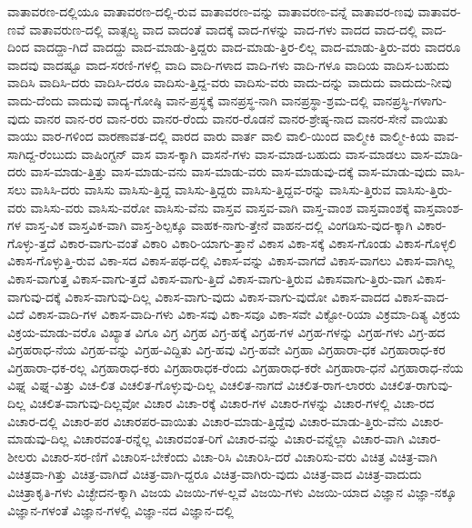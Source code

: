 {ವಾತಾವರಣ-ದಲ್ಲಿಯೂ
ವಾತಾವರಣ-ದಲ್ಲಿ-ರುವ
ವಾತಾವರಣ-ವನ್ನು
ವಾತಾವರಣ-ವನ್ನೆ
ವಾತಾವರ-ಣವು
ವಾತಾವರ-ಣವೆ
ವಾತಾವರುಣ-ದಲ್ಲಿ
ವಾತ್ಸಲ್ಯ
ವಾದ
ವಾದಂತೆ
ವಾದಕ್ಕೆ
ವಾದ-ಗಳನ್ನು
ವಾದ-ಗಳು
ವಾದದ
ವಾದ-ದಲ್ಲಿ
ವಾದ-ದಿಂದ
ವಾದದ್ದಾ-ಗಿದೆ
ವಾದದ್ದು
ವಾದ-ಮಾಡು-ತ್ತಿದ್ದರು
ವಾದ-ಮಾಡು-ತ್ತಿರ-ಲಿಲ್ಲ
ವಾದ-ಮಾಡು-ತ್ತಿರು-ವರು
ವಾದರೂ
ವಾದವು
ವಾದಷ್ಟೂ
ವಾದ-ಸರಣಿ-ಗಳಲ್ಲಿ
ವಾದಿ
ವಾದಿ-ಗಳಾದ
ವಾದಿ-ಗಳು
ವಾದಿ-ಗಳೂ
ವಾದಿಯ
ವಾದಿಸ-ಬಹುದು
ವಾದಿಸಿ
ವಾದಿಸಿ-ದರು
ವಾದಿಸಿ-ದರೂ
ವಾದಿಸು-ತ್ತಿದ್ದ-ವರು
ವಾದಿಸು-ವರು
ವಾದು-ದನ್ನು
ವಾದುದು
ವಾದುದು-ನೀವು
ವಾದು-ದೆಂದು
ವಾದುವು
ವಾದ್ಯ-ಗೋಷ್ಠಿ
ವಾನ-ಪ್ರಸ್ಥಕ್ಕೆ
ವಾನಪ್ರಸ್ಥ-ನಾಗಿ
ವಾನಪ್ರಸ್ಥಾ-ಶ್ರಮ-ದಲ್ಲಿ
ವಾನಪ್ರಸ್ಥಿ-ಗಳಾಗು-ವುದು
ವಾನರ
ವಾನ-ರರ
ವಾನ-ರರು
ವಾನರ-ರೆಂದು
ವಾನರ-ರೊಡನೆ
ವಾನರ-ಶ್ರೇಷ್ಠ-ನಾದ
ವಾನರ-ಸೇನೆ
ವಾಯಿತು
ವಾಯು
ವಾರ-ಗಳಿಂದ
ವಾರಣಾವತ-ದಲ್ಲಿ
ವಾರದ
ವಾರು
ವಾರ್ತ
ವಾಲಿ
ವಾಲಿ-ಯಿಂದ
ವಾಲ್ಮೀಕಿ
ವಾಲ್ಮೀ-ಕಿಯ
ವಾವ-ಸಾಗಿದ್ದ-ರೆಂಬುದು
ವಾಷಿಂಗ್ಟನ್
ವಾಸ
ವಾಸ-ಕ್ಕಾಗಿ
ವಾಸನೆ-ಗಳು
ವಾಸ-ಮಾಡ-ಬಹುದು
ವಾಸ-ಮಾಡಲು
ವಾಸ-ಮಾಡಿ-ದರು
ವಾಸ-ಮಾಡು-ತ್ತಿತ್ತು
ವಾಸ-ಮಾಡು-ವನು
ವಾಸ-ಮಾಡು-ವರು
ವಾಸ-ಮಾಡುವು-ದಕ್ಕೆ
ವಾಸ-ಮಾಡು-ವುದು
ವಾಸಿ-ಸಲು
ವಾಸಿಸಿ-ದರು
ವಾಸಿಸು
ವಾಸಿಸು-ತ್ತಿದ್ದ
ವಾಸಿಸು-ತ್ತಿದ್ದರು
ವಾಸಿಸು-ತ್ತಿದ್ದವ-ರನ್ನು
ವಾಸಿಸು-ತ್ತಿರುವ
ವಾಸಿಸು-ತ್ತಿರು-ವರು
ವಾಸಿಸು-ವರು
ವಾಸಿಸು-ವರೋ
ವಾಸಿಸು-ವೆನು
ವಾಸ್ತವ
ವಾಸ್ತವ-ವಾಗಿ
ವಾಸ್ತ-ವಾಂಶ
ವಾಸ್ತವಾಂಶಕ್ಕೆ
ವಾಸ್ತವಾಂಶ-ಗಳ
ವಾಸ್ತ-ವಿಕ
ವಾಸ್ತವಿಕ-ವಾಗಿ
ವಾಸ್ತ-ಶಿಲ್ಪಕ್ಕೂ
ವಾಹಕ-ನಾಗು-ತ್ತೇನೆ
ವಾಹನ-ದಲ್ಲಿ
ವಿಂಗಡಿಸು-ವುದ-ಕ್ಕಾಗಿ
ವಿಕಾರ-ಗೊಳ್ಳು-ತ್ತದೆ
ವಿಕಾರ-ವಾಗು-ವಂತೆ
ವಿಕಾರಿ
ವಿಕಾರಿ-ಯಾಗು-ತ್ತಾನೆ
ವಿಕಾಸ
ವಿಕಾ-ಸಕ್ಕೆ
ವಿಕಾಸ-ಗೊಂಡು
ವಿಕಾಸ-ಗೊಳ್ಳಲಿ
ವಿಕಾಸ-ಗೊಳ್ಳುತ್ತಿ-ರುವ
ವಿಕಾ-ಸದ
ವಿಕಾಸ-ಪಥ-ದಲ್ಲಿ
ವಿಕಾಸ-ವನ್ನು
ವಿಕಾಸ-ವಾಗದೆ
ವಿಕಾಸ-ವಾಗಲು
ವಿಕಾಸ-ವಾಗಿಲ್ಲ
ವಿಕಾಸ-ವಾಗುತ್ತ
ವಿಕಾಸ-ವಾಗು-ತ್ತದೆ
ವಿಕಾಸ-ವಾಗು-ತ್ತಿದೆ
ವಿಕಾಸ-ವಾಗು-ತ್ತಿರುವ
ವಿಕಾಸವಾಗು-ತ್ತಿರು-ವಾಗ
ವಿಕಾಸ-ವಾಗುವು-ದಕ್ಕೆ
ವಿಕಾಸ-ವಾಗುವು-ದಿಲ್ಲ
ವಿಕಾಸ-ವಾಗು-ವುದು
ವಿಕಾಸ-ವಾಗು-ವುದೋ
ವಿಕಾಸ-ವಾದದ
ವಿಕಾಸ-ವಾದ-ವಿದೆ
ವಿಕಾಸ-ವಾದಿ-ಗಳ
ವಿಕಾಸ-ವಾದಿ-ಗಳು
ವಿಕಾ-ಸವು
ವಿಕಾ-ಸವೂ
ವಿಕಾ-ಸವೇ
ವಿಕ್ಟೋ-ರಿಯಾ
ವಿಕ್ರಮಾ-ದಿತ್ಯ
ವಿಕ್ರಯ
ವಿಕ್ರಯ-ಮಾಡು-ವರೊ
ವಿಖ್ಯಾತ
ವಿಗೂ
ವಿಗ್ರ
ವಿಗ್ರಹ
ವಿಗ್ರ-ಹಕ್ಕೆ
ವಿಗ್ರಹ-ಗಳ
ವಿಗ್ರಹ-ಗಳನ್ನು
ವಿಗ್ರಹ-ಗಳು
ವಿಗ್ರ-ಹದ
ವಿಗ್ರಹರಾಧ-ನೆಯ
ವಿಗ್ರಹ-ವನ್ನು
ವಿಗ್ರಹ-ವಿದ್ದಿತು
ವಿಗ್ರ-ಹವು
ವಿಗ್ರ-ಹವೇ
ವಿಗ್ರಹಾ
ವಿಗ್ರಹಾರಾ-ಧಕ
ವಿಗ್ರಹಾರಾಧ-ಕರ
ವಿಗ್ರಹಾರಾ-ಧಕ-ರಲ್ಲ
ವಿಗ್ರಹಾರಾಧ-ಕರು
ವಿಗ್ರಹಾರಾಧಕ-ರೆಂದು
ವಿಗ್ರಹಾರಾಧ-ಕರೇ
ವಿಗ್ರಹಾರಾ-ಧನೆ
ವಿಗ್ರಹಾರಾಧ-ನೆಯ
ವಿಘ್ನ
ವಿಘ್ನ-ವಿತ್ತು
ವಿಚ-ಲಿತ
ವಿಚಲಿತ-ಗೊಳ್ಳುವು-ದಿಲ್ಲ
ವಿಚಲಿತ-ನಾಗದೆ
ವಿಚಲಿತ-ರಾಗ-ಲಾರರು
ವಿಚಲಿತ-ರಾಗುವು-ದಿಲ್ಲ
ವಿಚಲಿತ-ವಾಗುವು-ದಿಲ್ಲವೋ
ವಿಚಾರ
ವಿಚಾ-ರಕ್ಕೆ
ವಿಚಾರ-ಗಳ
ವಿಚಾರ-ಗಳನ್ನು
ವಿಚಾರ-ಗಳಲ್ಲಿ
ವಿಚಾ-ರದ
ವಿಚಾರ-ದಲ್ಲಿ
ವಿಚಾರ-ಪರ
ವಿಚಾರಪರ-ವಾಯಿತು
ವಿಚಾರ-ಮಾಡು-ತ್ತಿದ್ದೆವು
ವಿಚಾರ-ಮಾಡು-ತ್ತಿರು-ವೆನು
ವಿಚಾರ-ಮಾಡುವು-ದಿಲ್ಲ
ವಿಚಾರವಂತ-ರನ್ನೆಲ್ಲ
ವಿಚಾರವಂತ-ರಿಗೆ
ವಿಚಾರ-ವನ್ನು
ವಿಚಾರ-ವನ್ನೆಲ್ಲಾ
ವಿಚಾರ-ವಾಗಿ
ವಿಚಾರ-ಶೀಲರು
ವಿಚಾರ-ಸರ-ಣಿಗೆ
ವಿಚಾರಿಸ-ಬೇಕೆಂದು
ವಿಚಾ-ರಿಸಿ
ವಿಚಾರಿಸಿ-ದರೆ
ವಿಚಾರಿಸು-ವರು
ವಿಚಿತ್ರ
ವಿಚಿತ್ರ-ವಾಗಿ
ವಿಚಿತ್ರವಾ-ಗಿತ್ತು
ವಿಚಿತ್ರ-ವಾಗಿದೆ
ವಿಚಿತ್ರ-ವಾಗಿ-ದ್ದರೂ
ವಿಚಿತ್ರ-ವಾಗಿರು-ವುದು
ವಿಚಿತ್ರ-ವಾದ
ವಿಚಿತ್ರ-ವಾದುದು
ವಿಚಿತ್ರಾಕೃತಿ-ಗಳು
ವಿಚ್ಛೇದನ-ಕ್ಕಾಗಿ
ವಿಜಯ
ವಿಜಯಿ-ಗಳ-ಲ್ಲವೆ
ವಿಜಯಿ-ಗಳು
ವಿಜಯಿ-ಯಾದ
ವಿಜ್ಞಾನ
ವಿಜ್ಞಾ-ನಕ್ಕೂ
ವಿಜ್ಞಾನ-ಗಳಂತೆ
ವಿಜ್ಞಾನ-ಗಳಲ್ಲಿ
ವಿಜ್ಞಾ-ನದ
ವಿಜ್ಞಾನ-ದಲ್ಲಿ
}
